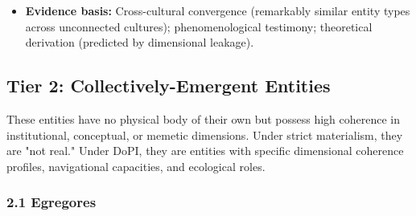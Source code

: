 \begin{itemize}[nosep,leftmargin=*]
  \item \textbf{Evidence basis:} Cross-cultural convergence (remarkably similar entity types across unconnected cultures); phenomenological testimony; theoretical derivation (predicted by dimensional leakage).
\end{itemize}


\bigskip\noindent\makebox[\textwidth]{\color{rulegray}\rule{5cm}{0.3pt}}\bigskip


\subsection*{Tier 2: Collectively-Emergent Entities}


These entities have no physical body of their own but possess high coherence in institutional, conceptual, or memetic dimensions. Under strict materialism, they are "not real." Under DoPI, they are entities with specific dimensional coherence profiles, navigational capacities, and ecological roles.


\subsubsection*{2.1 Egregores}

